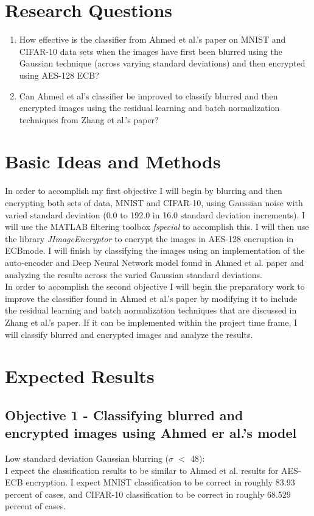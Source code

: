 \documentclass[12pt, titlepage]{article}
\begin{document}
\section{Research Questions}\label{rq}
\begin{enumerate}
	\item How effective is the classifier from Ahmed et al.'s paper on MNIST and CIFAR-10 data sets when the images have first been blurred using the Gaussian technique (across varying standard deviations) and then encrypted using AES-128 ECB?
	\item Can Ahmed et al's classifier be improved to classify blurred and then encrypted images using the residual learning and batch normalization techniques from Zhang et al.'s paper?
\end{enumerate}

\section{Basic Ideas and Methods}\label{im}
In order to accomplish my first objective I will begin by blurring and then encrypting both sets of data, MNIST and CIFAR-10, using Gaussian noise with varied standard deviation (0.0 to 192.0 in 16.0 standard deviation increments). I will use the MATLAB filtering toolbox \emph{fspecial} to accomplish this. I will then use the library \emph{JImageEncryptor} to encrypt the images in AES-128 encruption in ECBmode. I will finish by classifying the images using an implementation of the auto-encoder and Deep Neural Network model found in Ahmed et al. paper and analyzing the results across the varied Gaussian standard deviations.\\

\noindent In order to accomplish the second objective I will begin the preparatory work to improve the classifier found in Ahmed et al.'s paper by modifying it to include the residual learning and batch normalization techniques that are discussed in Zhang et al.'s paper. If it can be implemented within the project time frame, I will classify blurred and encrypted images and analyze the results.

\section{Expected Results}\label{er}
\subsection{Objective 1 - Classifying blurred and encrypted images using Ahmed er al.'s model}
Low standard deviation Gaussian blurring ($\sigma$ $<$ 48):\\ I expect the classification results to be similar to Ahmed et al. results for AES-ECB encryption. I expect MNIST classification to be correct in roughly 83.93 percent of cases, and CIFAR-10 classification to be correct in roughly 68.529 percent of cases.\\
\end{document}
